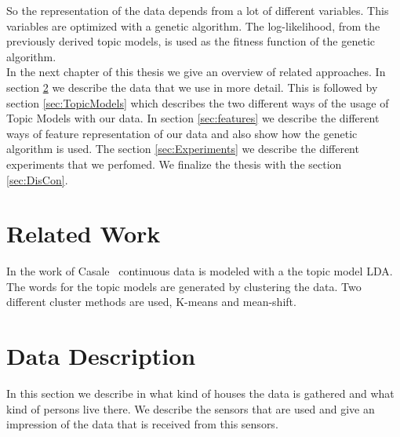 \documentclass[11pt,a4paper]{article}
\begin{document}
So the representation of the data depends from a lot of different variables. This variables are optimized with a genetic algorithm. The log-likelihood, from the previously derived topic models, is used as the fitness function of the genetic algorithm.\\

In the next chapter of this thesis we give an overview of related approaches. In section \ref{sec:DataDesc} we describe the data that we use in more detail. This is followed by section \ref{sec:TopicModels} which describes the two different ways of the usage of Topic Models with our data. In section \ref{sec:features} we describe the different ways of feature representation of our data and also show how the genetic algorithm is used. The section \ref{sec:Experiments} we describe the different experiments that we perfomed. We finalize the thesis with the section \ref{sec:DisCon}.


% 
% 
% 


\section{Related Work}
In the work of Casale~\cite{Casale:2009} continuous data is modeled with a the topic model LDA. The words for the topic models are generated by clustering the data. Two different cluster methods are used, K-means and mean-shift.



\section{Data Description}
\label{sec:DataDesc}
In this section we describe in what kind of houses the data is gathered and what kind of persons live there. We describe the sensors that are used and give an impression of the data that is received from this sensors.
\end{document}
